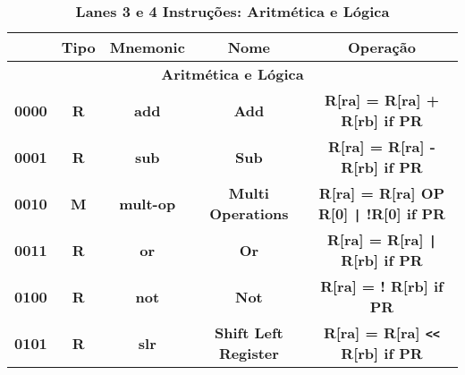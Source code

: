 \documentclass{article}
\begin{document}
    \begin{table}[H]
      \centering
      \captionsetup{labelformat=empty, skip=0pt}
      \caption{\textbf{Lanes 3 e 4 Instruções: Aritmética e Lógica}}
      \noindent\hspace*{-1cm}%
      \begin{tabular}{|c|*{4}{c|}}
        \hline
        \rowcolor{gray!50}
        \multicolumn{1}{|c|}{\textbf{Opcode}} & \multicolumn{1}{|c|}{\textbf{Tipo}} & \multicolumn{1}{|c|}{\textbf{Mnemonic}} & \multicolumn{1}{|c|}{\textbf{Nome}}                & \multicolumn{1}{|c|}{\textbf{Operação}}                                     \\ \hline
        \multicolumn{5}{|c|}{\textbf{Aritmética e Lógica}} \\ \hline 
        \multicolumn{1}{|c|}{\textbf{0000}}   & \multicolumn{1}{c|}{\textbf{R}}     & \multicolumn{1}{c|}{\textbf{add}}       & \multicolumn{1}{c|}{\textbf{Add}}                  & \multicolumn{1}{c|}{\textbf{R[ra] = R[ra] + R[rb] if PR}}                   \\ \hline
        \multicolumn{1}{|c|}{\textbf{0001}}   & \multicolumn{1}{c|}{\textbf{R}}     & \multicolumn{1}{c|}{\textbf{sub}}       & \multicolumn{1}{c|}{\textbf{Sub}}                  & \multicolumn{1}{c|}{\textbf{R[ra] = R[ra] - R[rb] if PR}}                   \\ \hline
        \multicolumn{1}{|c|}{\textbf{0010}}   & \multicolumn{1}{c|}{\textbf{M}}     & \multicolumn{1}{c|}{\textbf{mult-op}}   & \multicolumn{1}{c|}{\textbf{Multi Operations}}     & \multicolumn{1}{c|}{\textbf{R[ra] = R[ra] OP R[0] \texttt{|} !R[0] if PR}}  \\ \hline
        \multicolumn{1}{|c|}{\textbf{0011}}   & \multicolumn{1}{c|}{\textbf{R}}     & \multicolumn{1}{c|}{\textbf{or}}        & \multicolumn{1}{c|}{\textbf{Or}}                   & \multicolumn{1}{c|}{\textbf{R[ra] = R[ra] \texttt{|} R[rb] if PR}}          \\ \hline
        \multicolumn{1}{|c|}{\textbf{0100}}   & \multicolumn{1}{c|}{\textbf{R}}     & \multicolumn{1}{c|}{\textbf{not}}       & \multicolumn{1}{c|}{\textbf{Not}}                  & \multicolumn{1}{c|}{\textbf{R[ra] = ! R[rb] if PR}}                         \\ \hline
        \multicolumn{1}{|c|}{\textbf{0101}}   & \multicolumn{1}{c|}{\textbf{R}}     & \multicolumn{1}{c|}{\textbf{slr}}       & \multicolumn{1}{c|}{\textbf{Shift Left Register}}  & \multicolumn{1}{c|}{\textbf{R[ra] = R[ra] \texttt{<<} R[rb] if PR}}         \\ \hline

\end{tabular}
\end{table}
\end{document}
